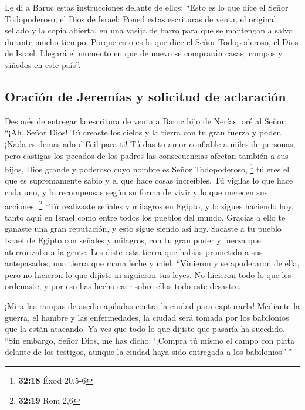  Le di a Baruc estas instrucciones delante de ellos:
 ``Esto es lo que dice el Señor Todopoderoso, el Dios de
Israel: Poned estas escrituras de venta, el original sellado y la copia
abierta, en una vasija de barro para que se mantengan a salvo durante
mucho tiempo.  Porque esto es lo que dice el Señor
Todopoderoso, el Dios de Israel: Llegará el momento en que de nuevo se
comprarán casas, campos y viñedos en este país''.

\hypertarget{oraciuxf3n-de-jeremuxedas-y-solicitud-de-aclaraciuxf3n}{%
\subsection{Oración de Jeremías y solicitud de
aclaración}\label{oraciuxf3n-de-jeremuxedas-y-solicitud-de-aclaraciuxf3n}}

 Después de entregar la escritura de venta a Baruc hijo
de Nerías, oré al Señor:  ``¡Ah, Señor Dios! Tú creaste
los cielos y la tierra con tu gran fuerza y poder. ¡Nada es demasiado
difícil para ti!  Tú das tu amor confiable a miles de
personas, pero castigas los pecados de los padres las consecuencias
afectan también a sus hijos, Dios grande y poderoso cuyo nombre es Señor
Todopoderoso, \footnote{\textbf{32:18} Éxod 20,5-6}  tú
eres el que es supremamente sabio y el que hace cosas increíbles. Tú
vigilas lo que hace cada uno, y lo recompensas según su forma de vivir y
lo que merecen sus acciones. \footnote{\textbf{32:19} Rom 2,6}
 ``Tú realizaste señales y milagros en Egipto, y lo
sigues haciendo hoy, tanto aquí en Israel como entre todos los pueblos
del mundo. Gracias a ello te ganaste una gran reputación, y esto sigue
siendo así hoy.  Sacaste a tu pueblo Israel de Egipto con
señales y milagros, con tu gran poder y fuerza que aterrorizaba a la
gente.  Les diste esta tierra que habías prometido a sus
antepasados, una tierra que mana leche y miel. 
``Vinieron y se apoderaron de ella, pero no hicieron lo que dijiste ni
siguieron tus leyes. No hicieron todo lo que les ordenaste, y por eso
has hecho caer sobre ellos todo este desastre.

 ¡Mira las rampas de asedio apiladas contra la ciudad
para capturarla! Mediante la guerra, el hambre y las enfermedades, la
ciudad será tomada por los babilonios que la están atacando. Ya ves que
todo lo que dijiste que pasaría ha sucedido.  ``Sin
embargo, Señor Dios, me has dicho: `¡Compra tú mismo el campo con plata
delante de los testigos, aunque la ciudad haya sido entregada a los
babilonios!'\,''

